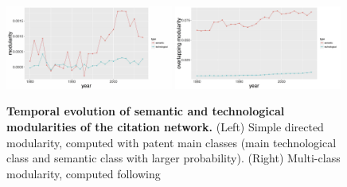 \documentclass[12pt,twoside,a4paper]{article}
\begin{document}
\begin{figure}[!ht]
\centering
\includegraphics[width=0.49\textwidth]{simplemodularity.jpg}
\includegraphics[width=0.49\textwidth]{overlappingmodularity.jpg}
\caption{\textbf{Temporal evolution of semantic and technological modularities of the citation network.} (Left) Simple directed modularity, computed with patent main classes (main technological class and semantic class with larger probability). (Right) Multi-class modularity, computed following~\cite{nicosia2009extending} }
\label{fig:modularities}
\end{figure}


\end{document}

